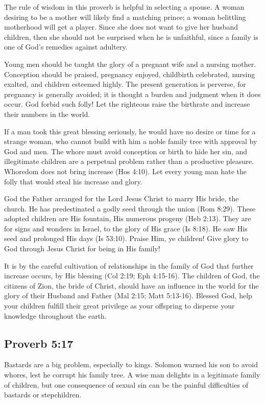 The rule of wisdom in this proverb is helpful in selecting a spouse. A woman desiring to be a mother will likely find a matching prince; a woman belittling motherhood will get a player. Since she does not want to give her husband children, then she should not be surprised when he is unfaithful, since a family is one of God’s remedies against adultery.

Young men should be taught the glory of a pregnant wife and a nursing mother. Conception should be praised, pregnancy enjoyed, childbirth celebrated, nursing exalted, and children esteemed highly. The present generation is perverse, for pregnancy is generally avoided; it is thought a burden and judgment when it does occur. God forbid such folly! Let the righteous raise the birthrate and increase their numbers in the world.

If a man took this great blessing seriously, he would have no desire or time for a strange woman, who cannot build with him a noble family tree with approval by God and men. The whore must avoid conception or birth to hide her sin, and illegitimate children are a perpetual problem rather than a productive pleasure. Whoredom does not bring increase (Hos 4:10). Let every young man hate the folly that would steal his increase and glory.

God the Father arranged for the Lord Jesus Christ to marry His bride, the church. He has predestinated a godly seed through the union (Rom 8:29). These adopted children are His fountain, His numerous progeny (Heb 2:13). They are for signs and wonders in Israel, to the glory of His grace (Is 8:18). He saw His seed and prolonged His days (Is 53:10). Praise Him, ye children! Give glory to God through Jesus Christ for being in His family! 

It is by the careful cultivation of relationships in the family of God that further increase occurs, by His blessing (Col 2:19; Eph 4:15-16). The children of God, the citizens of Zion, the bride of Christ, should have an influence in the world for the glory of their Husband and Father (Mal 2:15; Matt 5:13-16). Blessed God, help your children fulfill their great privilege as your offspring to disperse your knowledge throughout the earth.

\subsection{Proverb 5:17}
Bastards are a big problem, especially to kings. Solomon warned his son to avoid whores, lest he corrupt his family tree. A wise man delights in a legitimate family of children, but one consequence of sexual sin can be the painful difficulties of bastards or stepchildren.

